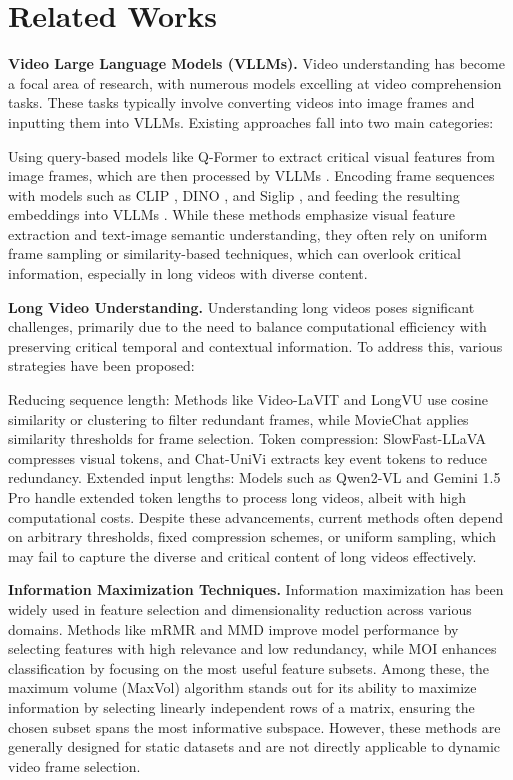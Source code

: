 \section{Related Works}
\textbf{Video Large Language Models (VLLMs).}
Video understanding has become a focal area of research, with numerous models excelling at video comprehension tasks. These tasks typically involve converting videos into image frames and inputting them into VLLMs. Existing approaches fall into two main categories:

Using query-based models like Q-Former \cite{blip2} to extract critical visual features from image frames, which are then processed by VLLMs \cite{mvbench, xenos2024vllms}.
Encoding frame sequences with models such as CLIP \cite{clip}, DINO \cite{dino}, and Siglip \cite{Siglip}, and feeding the resulting embeddings into VLLMs \cite{longvu, Chat-univi, video-lavit, qwen2-vl, internvl, omnifusion}.
While these methods emphasize visual feature extraction and text-image semantic understanding, they often rely on uniform frame sampling or similarity-based techniques, which can overlook critical information, especially in long videos with diverse content.

\textbf{Long Video Understanding.}
Understanding long videos poses significant challenges, primarily due to the need to balance computational efficiency with preserving critical temporal and contextual information. To address this, various strategies have been proposed:

Reducing sequence length: Methods like Video-LaVIT \cite{video-lavit} and LongVU \cite{longvu} use cosine similarity or clustering to filter redundant frames, while MovieChat \cite{song2024moviechat} applies similarity thresholds for frame selection.
Token compression: SlowFast-LLaVA \cite{slowfast} compresses visual tokens, and Chat-UniVi \cite{Chat-univi} extracts key event tokens to reduce redundancy.
Extended input lengths: Models such as Qwen2-VL \cite{qwen2-vl} and Gemini 1.5 Pro \cite{team2024gemini} handle extended token lengths to process long videos, albeit with high computational costs.
Despite these advancements, current methods often depend on arbitrary thresholds, fixed compression schemes, or uniform sampling, which may fail to capture the diverse and critical content of long videos effectively.

\textbf{Information Maximization Techniques.}
Information maximization has been widely used in feature selection and dimensionality reduction across various domains. Methods like mRMR \cite{peng2005feature} and MMD \cite{MMD} improve model performance by selecting features with high relevance and low redundancy, while MOI \cite{MOI} enhances classification by focusing on the most useful feature subsets. Among these, the maximum volume (MaxVol) algorithm \cite{goreinov2010find, Rectmax, sozykin2022ttopt} stands out for its ability to maximize information by selecting linearly independent rows of a matrix, ensuring the chosen subset spans the most informative subspace. However, these methods are generally designed for static datasets and are not directly applicable to dynamic video frame selection.


